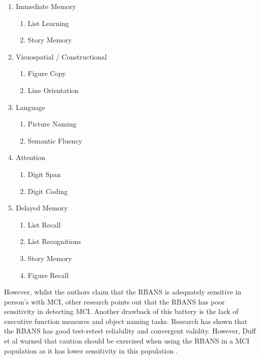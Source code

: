 \documentclass[10pt, letterpaper, twoside, openany]{book}
\begin{document}
\begin{enumerate}
	\item Immediate Memory 
	\begin{enumerate}
		\item{List Learning}
		\item{Story Memory}
	\end{enumerate}
	\item Visuospatial / Constructional
	\begin{enumerate}
		\item{Figure Copy}
		\item{Line Orientation}
	\end{enumerate}
	\item Language
	\begin{enumerate}
		\item{Picture Naming}
		\item{Semantic Fluency}
	\end{enumerate}
	\item Attention
	\begin{enumerate}
		\item{Digit Span}
		\item{Digit Coding}
	\end{enumerate}
	\item Delayed Memory
	\begin{enumerate}
		\item{List Recall}
		\item{List Recognitions}
		\item{Story Memory}
		\item{Figure Recall}
	\end{enumerate}
\end{enumerate}

However, whilst the authors claim that the RBANS is adequately sensitive in person's with MCI, other research points out that the RBANS has poor sensitivity in detecting MCI. Another drawback of this battery is the lack of executive function measures and object naming tasks. Research has shown that the RBANS has good test-retest reliability and convergent validity. However, Duff et al warned that caution should be exercised when using the RBANS in a MCI population as it has lower sensitivity in this population \cite{Duff2010}.
\end{document}
